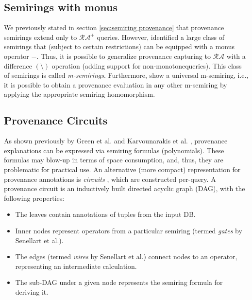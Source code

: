 \subsection{Semirings with monus} We previously stated in section \ref{sec:semiring provenance} that provenance semirings extend only to  $\mathcal{RA^+}$ queries. However, \cite{monus_k_relations} identified a large class of semirings that (subject to certain restrictions) can be equipped with a monus operator $-$. Thus, it is possible to generalize provenance capturing to $\mathcal{RA}$ with a difference $(\setminus)$ operation (adding support for non-monotone\footnotemark queries). 
This class of semirings is called \textit{m-semirings}. Furthermore, \cite{monus_k_relations} show a universal m-semiring, i.e., it is possible to obtain a provenance evaluation in any other m-semiring by applying the appropriate semiring homomorphism.
\subsection{Provenance Circuits}\label{sec:provenance circuits}
As shown previously by Green et al. \cite{green2007provenance} and Karvounarakis et al. \cite{Karvounarakis:2012:SDQ:2380776.2380778}, provenance explanations can be expressed via semiring formulas (polynomials). These formulas may blow-up in terms of space consumption, and, thus, they are problematic for practical use. An alternative (more compact) representation for provenance annotations is  \textit{circuits} \cite{Deutch2014, Senellart2017}, which are constructed per-query. A provenance circuit is an inductively built directed acyclic graph (DAG), with the following properties:
\begin{itemize}
    \item The leaves contain annotations of tuples from the input DB.
    \item Inner nodes represent operators from a particular semiring (termed \textit{gates} by Senellart et al.). 
    \item The edges (termed \textit{wires} by Senellart et al.) connect nodes to an operator, representing an intermediate calculation.
    \item The sub-DAG under a given node represents the semiring formula for deriving it. 
\end{itemize}
